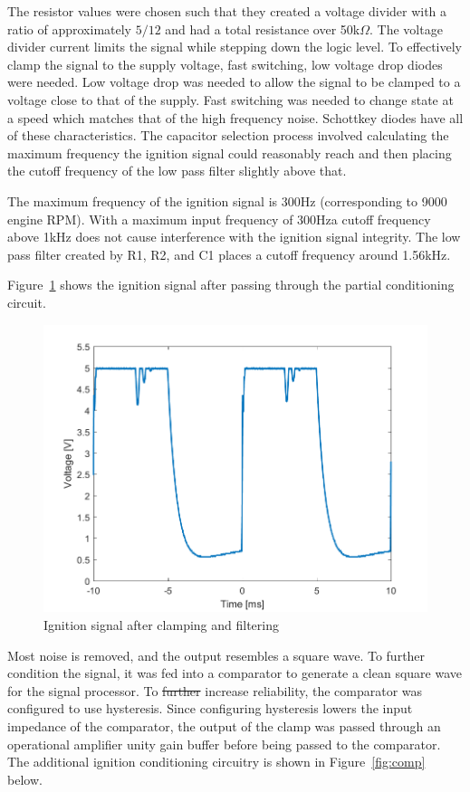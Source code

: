 \documentclass[11pt]{article}
\providecommand{\DIFaddtex}[1]{{\protect\color{blue}\uwave{#1}}} %
\providecommand{\DIFdeltex}[1]{{\protect\color{red}\sout{#1}}}                      %
\providecommand{\DIFaddbegin}{} %
\providecommand{\DIFaddend}{} %
\providecommand{\DIFdelbegin}{} %
\providecommand{\DIFdelend}{} %
\providecommand{\DIFadd}[1]{\texorpdfstring{\DIFaddtex{#1}}{#1}} %
\providecommand{\DIFdel}[1]{\texorpdfstring{\DIFdeltex{#1}}{}} %
\newcommand{\DIFscaledelfig}{0.5}
\newlength{\DIFdelgraphicswidth} %
\newlength{\DIFdelgraphicsheight} %
\newcommand{\DIFaddincludegraphics}[2][]{{\color{blue}\fbox{\DIFOincludegraphics[#1]{#2}}}} %
\newcommand{\DIFdelincludegraphics}[2][]{%
\sbox{\DIFdelgraphicsbox}{\DIFOincludegraphics[#1]{#2}}%
\settoboxwidth{\DIFdelgraphicswidth}{\DIFdelgraphicsbox} %
\settoboxtotalheight{\DIFdelgraphicsheight}{\DIFdelgraphicsbox} %
\scalebox{\DIFscaledelfig}{%
\parbox[b]{\DIFdelgraphicswidth}{\usebox{\DIFdelgraphicsbox}\\[-\baselineskip] \rule{\DIFdelgraphicswidth}{0em}}\llap{\resizebox{\DIFdelgraphicswidth}{\DIFdelgraphicsheight}{%
\setlength{\unitlength}{\DIFdelgraphicswidth}%
\begin{picture}(1,1)%
\thicklines\linethickness{2pt} %
{\color[rgb]{1,0,0}\put(0,0){\framebox(1,1){}}}%
{\color[rgb]{1,0,0}\put(0,0){\line( 1,1){1}}}%
{\color[rgb]{1,0,0}\put(0,1){\line(1,-1){1}}}%
\end{picture}%
}\hspace*{3pt}}} %
} %
\DeclareRobustCommand{\DIFaddbegin}{\DIFOaddbegin \let\includegraphics\DIFaddincludegraphics} %
\DeclareRobustCommand{\DIFaddend}{\DIFOaddend \let\includegraphics\DIFOincludegraphics} %
\DeclareRobustCommand{\DIFdelbegin}{\DIFOdelbegin \let\includegraphics\DIFdelincludegraphics} %
\DeclareRobustCommand{\DIFdelend}{\DIFOaddend \let\includegraphics\DIFOincludegraphics} %
\begin{document}
The resistor values were chosen such that they created a voltage divider with a ratio of approximately $5/12$ and had a total resistance over 50k$\Omega$. The voltage divider current limits the signal while stepping down the logic level. To effectively clamp the signal to the supply voltage, fast switching, low voltage drop diodes were needed. Low voltage drop was needed to allow the signal to be clamped to a voltage close to that of the supply. Fast switching was needed to change state at a speed which matches that of the high frequency noise. Schottkey diodes have all of these characteristics. The capacitor selection process involved calculating the maximum frequency the ignition signal could reasonably reach and then placing the cutoff frequency of the low pass filter slightly above that.

The maximum frequency of the ignition signal is 300Hz (corresponding to 9000 engine RPM). With a maximum input frequency of 300Hz\DIFaddbegin \DIFadd{, }\DIFaddend a cutoff frequency above 1kHz does not cause interference with the ignition signal integrity. The low pass filter created by R1, R2, and C1 places a cutoff frequency around 1.56kHz.

Figure~\ref{fig:diode} shows the ignition signal after passing through the partial conditioning circuit.
\begin{figure}[H]
    \centering
    \includegraphics[width=.75\textwidth]{diode}
    \caption{Ignition signal after clamping and filtering}
    \label{fig:diode}
\end{figure}

Most noise is removed, and the output resembles a square wave. To further condition the signal, it was fed into a comparator to generate a clean square wave for the signal processor. To \DIFdelbegin \DIFdel{further }\DIFdelend increase reliability, the comparator was configured to use hysteresis. Since configuring hysteresis lowers the input impedance of the comparator, the output of the clamp was passed through an operational amplifier unity gain buffer before being passed to the comparator. The additional ignition conditioning circuitry is shown in Figure~\ref{fig:comp} below.
\end{document}

